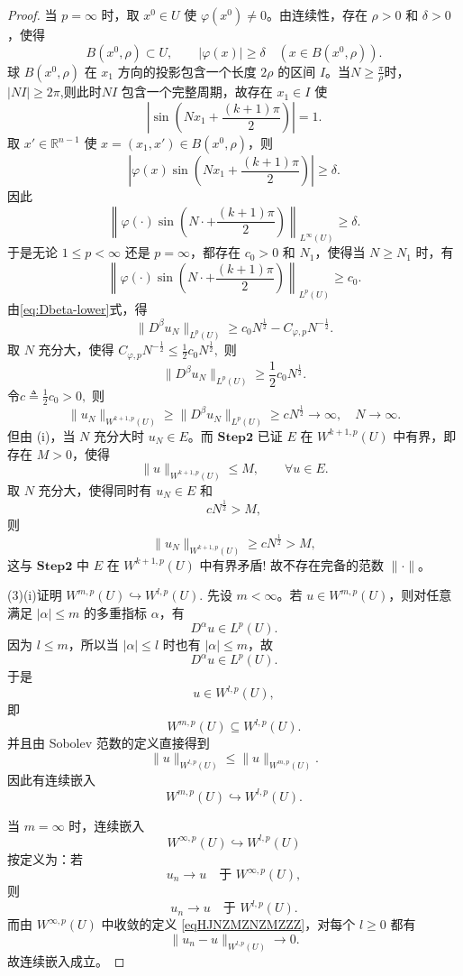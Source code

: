 \documentclass[../../main.tex]{subfiles}
\begin{document}
\begin{proof}
当 \(p=\infty\) 时，取 \(x^0\in U\) 使 \(\varphi(x^0)\neq0\)。由连续性，存在 \(\rho>0\) 和 \(\delta>0\)，使得
\[
B(x^0,\rho)\subset U,
\qquad
|\varphi(x)|\geqslant\delta
\quad(x\in B(x^0,\rho)).
\]
球 \(B(x^0,\rho)\) 在 \(x_1\) 方向的投影包含一个长度 \(2\rho\) 的区间 \(I\)。当$N\geqslant\frac{\pi}{\rho}$时，$|NI|\geqslant 2\pi$,则此时\(NI\) 包含一个完整周期，故存在 \(x_1\in I\) 使
\[
\left|\sin\left(Nx_1+\frac{(k+1)\pi}{2}\right)\right|=1.
\]
取 \(x'\in\mathbb R^{n-1}\) 使 \(x=(x_1,x')\in B(x^0,\rho)\)，则
\[
\left|
\varphi(x)\sin\left(Nx_1+\frac{(k+1)\pi}{2}\right)
\right|
\geqslant\delta.
\]
因此
\[
\left\|
\varphi(\cdot)
\sin\left(N\cdot+\frac{(k+1)\pi}{2}\right)
\right\|_{L^\infty(U)}
\geqslant\delta.
\]
于是无论 \(1\leqslant p<\infty\) 还是 \(p=\infty\)，都存在 \(c_0>0\) 和 \(N_1\)，使得当 \(N\geqslant N_1\) 时，有
\[
\left\|
\varphi(\cdot)
\sin\left(N\cdot+\frac{(k+1)\pi}{2}\right)
\right\|_{L^p(U)}
\geqslant c_0.
\]
由\eqref{eq:Dbeta-lower}式，得
\[
\|D^\beta u_N\|_{L^p(U)}
\geqslant
c_0N^{\frac12}
-
C_{\varphi,p}N^{-\frac12}.
\]
取 \(N\) 充分大，使得
$C_{\varphi,p}N^{-\frac12}
\leqslant
\frac12c_0N^{\frac12},$
则
\[
\|D^\beta u_N\|_{L^p(U)}
\geqslant
\frac12c_0N^{\frac12}.
\]
令$c\triangleq\frac12c_0>0,$
则
\[
\|u_N\|_{W^{k+1,p}(U)}
\geqslant
\|D^\beta u_N\|_{L^p(U)}
\geqslant
cN^{\frac12}\longrightarrow\infty,\quad N\to \infty.
\]
但由 (i)，当 \(N\) 充分大时 \(u_N\in E\)。而 \(\mathbf{Step}\mathbf{2}\) 已证 \(E\) 在 \(W^{k+1,p}(U)\) 中有界，即存在 \(M>0\)，使得
\[
\|u\|_{W^{k+1,p}(U)}\leqslant M,
\qquad
\forall u\in E.
\]
取 \(N\) 充分大，使得同时有 \(u_N\in E\) 和
\[
cN^{\frac12}>M,
\]
则
\[
\|u_N\|_{W^{k+1,p}(U)}
\geqslant
cN^{\frac12}>M,
\]
这与 \(\mathbf{Step}\mathbf{2}\) 中 \(E\) 在 \(W^{k+1,p}(U)\) 中有界矛盾!
故不存在完备的范数 \(\|\cdot\|\)。

(3){\heiti (i)证明 \(W^{m,p}(U)\hookrightarrow W^{l,p}(U)\).}
先设 \(m<\infty\)。若 \(u\in W^{m,p}(U)\)，则对任意满足 \(|\alpha|\leqslant m\) 的多重指标 \(\alpha\)，有
\[
D^\alpha u\in L^p(U).
\]
因为 \(l\leqslant m\)，所以当 \(|\alpha|\leqslant l\) 时也有 \(|\alpha|\leqslant m\)，故
\[
D^\alpha u\in L^p(U).
\]
于是
\[
u\in W^{l,p}(U),
\]
即
\[
W^{m,p}(U)\subseteq W^{l,p}(U).
\]
并且由 Sobolev 范数的定义直接得到
\[
\|u\|_{W^{l,p}(U)}
\leqslant
\|u\|_{W^{m,p}(U)}.
\]
因此有连续嵌入
\[
W^{m,p}(U)\hookrightarrow W^{l,p}(U).
\]

当 \(m=\infty\) 时，连续嵌入
\[
W^{\infty,p}(U)\hookrightarrow W^{l,p}(U)
\]
按定义为：若
\[
u_n\to u\quad\text{于 }W^{\infty,p}(U),
\]
则
\[
u_n\to u\quad\text{于 }W^{l,p}(U).
\]
而由 \(W^{\infty,p}(U)\) 中收敛的定义 \eqref{eqHJNZMZNZMZZZ}，对每个 \(l\geqslant0\) 都有
\[
\|u_n-u\|_{W^{l,p}(U)}\to0.
\]
故连续嵌入成立。


\end{proof}
\end{document}
